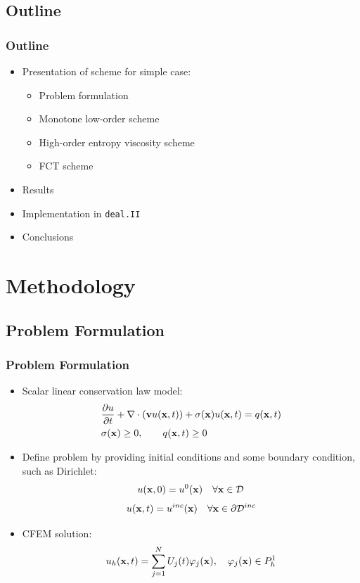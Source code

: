 \documentclass{beamer}
\begin{document}
\subsection{Outline}
\begin{frame}
\frametitle{Outline}

\begin{itemize}
   \item Presentation of scheme for simple case:
   \begin{itemize}
      \item Problem formulation
      \item Monotone low-order scheme
      \item High-order entropy viscosity scheme
      \item FCT scheme
   \end{itemize}
   \item Results
   \item Implementation in \texttt{deal.II}
   \item Conclusions
\end{itemize}

\end{frame}
\section{Methodology}
\subsection{Problem Formulation}
\begin{frame}
\frametitle{Problem Formulation}

\begin{itemize}
   \item Scalar linear conservation law model:
   \begin{align}
      &\frac{\partial u}{\partial t} + \nabla\cdot(\mathbf{v}u(\mathbf{x},t))
      + \sigma(\mathbf{x})u(\mathbf{x},t) = q(\mathbf{x},t)\\
      &\sigma(\mathbf{x})\ge 0,\qquad q(\mathbf{x},t)\ge 0\nonumber
   \end{align}
   \item Define problem by providing initial conditions and some boundary
      condition, such as Dirichlet:
   \begin{equation}
      u(\mathbf{x},0) = u^0(\mathbf{x}) \quad \forall \mathbf{x}\in \mathcal{D}
   \end{equation}
   \begin{equation}
      u(\mathbf{x},t) = u^{inc}(\mathbf{x}) \quad \forall \mathbf{x}\in \partial \mathcal{D}^{inc}
   \end{equation}
   \item CFEM solution:
   \begin{equation}
      u_h(\mathbf{x},t) = \sum\limits_{j=1}^N U_j(t) \varphi_j(\mathbf{x}),
      \quad \varphi_j(\mathbf{x})\in P^1_h
   \end{equation}
\end{itemize}

\end{frame}
\end{document}
